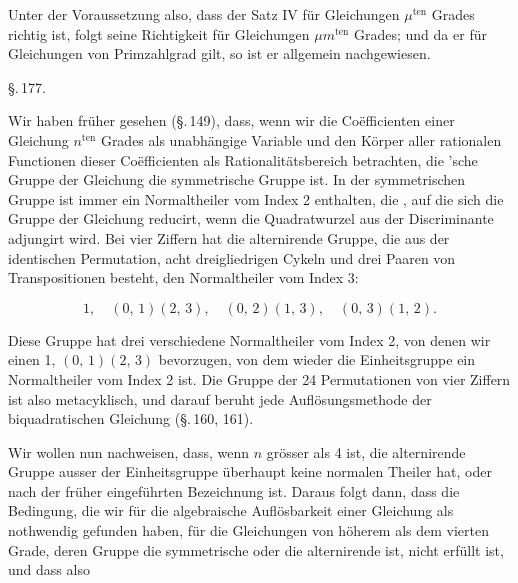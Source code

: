 
Unter der Voraussetzung also, dass der Satz IV für Gleichungen $\mu^{\text{ten}}$ Grades richtig ist, folgt seine Richtigkeit für Gleichungen $\mu m^{\text{ten}}$ Grades; und da er für Gleichungen von Primzahlgrad gilt, so ist er allgemein nachgewiesen.

\begin{center}
\S.\,177.

\end{center}

Wir haben früher gesehen (\S.\,149), dass, wenn wir die Co\"efficienten einer Gleichung $n^{\text{ten}}$ Grades als unabhängige Variable und den Körper aller rationalen Functionen dieser Co\"efficienten als Rationalitätsbereich betrachten, die 'sche Gruppe der Gleichung die symmetrische Gruppe ist. In der symmetrischen Gruppe ist immer ein Normaltheiler vom Index 2 enthalten, die , auf die sich die Gruppe der Gleichung reducirt, wenn die Quadratwurzel aus der Discriminante adjungirt wird. Bei vier Ziffern hat die alternirende Gruppe, die aus der identischen Permutation, acht dreigliedrigen Cykeln und drei Paaren von Transpositionen besteht, den Normaltheiler vom Index 3:

\[
1, \quad (0,\,1)(2,\,3), \quad (0,\,2)(1,\,3), \quad (0,\,3)(1,\,2).
\]

Diese Gruppe hat drei verschiedene Normaltheiler vom Index 2, von denen wir einen 1, $(0,\,1)(2,\,3)$ bevorzugen, von dem wieder die Einheitsgruppe ein Normaltheiler vom Index 2 ist. Die Gruppe der 24 Permutationen von vier Ziffern ist also metacyklisch, und darauf beruht jede Auflösungsmethode der biquadratischen Gleichung (\S.\,160, 161).

Wir wollen nun nachweisen, dass, wenn $n$ grösser als 4 ist, die alternirende Gruppe ausser der Einheitsgruppe überhaupt keine normalen Theiler hat, oder nach der früher eingeführten Bezeichnung  ist. Daraus folgt dann, dass die Bedingung, die wir für die algebraische Auflösbarkeit einer Gleichung als nothwendig gefunden haben, für die Gleichungen von höherem als dem vierten Grade, deren Gruppe die symmetrische oder die alternirende ist, nicht erfüllt ist, und dass also 
